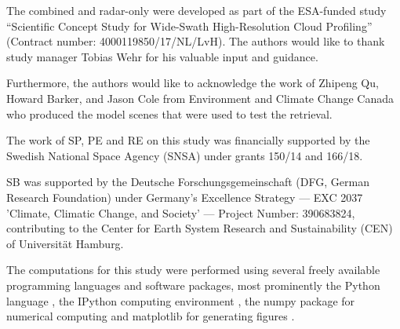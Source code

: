 \documentclass[journal abbreviation, manuscript]{copernicus}
\begin{document}

\begin{acknowledgements}

The combined and radar-only were developed as part of the ESA-funded study
``Scientific Concept Study for Wide-Swath High-Resolution Cloud Profiling''
(Contract number: 4000119850/17/NL/LvH). The authors would like to thank
study manager Tobias Wehr for his valuable input and guidance.

Furthermore, the authors would like to acknowledge the work of Zhipeng Qu,
Howard Barker, and Jason Cole from Environment and Climate Change Canada who
produced the model scenes that were used to test the retrieval.

The work of SP, PE and RE on this study was financially supported by the Swedish National Space Agency
(SNSA) under grants 150/14 and 166/18.

SB was supported by the Deutsche Forschungsgemeinschaft (DFG, German Research
Foundation) under Germany's Excellence Strategy --- EXC 2037 'Climate, Climatic
Change, and Society' --- Project Number: 390683824, contributing to the Center
for Earth System Research and Sustainability (CEN) of Universit\"{a}t Hamburg.

The computations for this study were performed using several freely available programming
languages and software packages, most prominently the Python language
\citep{python}, the IPython computing environment \citep{ipython}, the numpy
package for numerical computing \citep{numpy} and matplotlib for generating
figures \citep{matplotlib}.

\end{acknowledgements}












\end{document}
